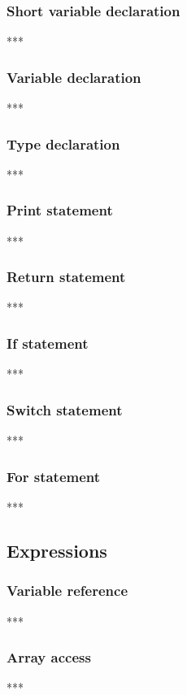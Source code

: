 \documentclass[oneside]{article}
\begin{document}
\subsubsection{Short variable declaration}
***

\subsubsection{Variable declaration}
***

\subsubsection{Type declaration}
***

\subsubsection{Print statement}
***

\subsubsection{Return statement}
***

\subsubsection{If statement}
***

\subsubsection{Switch statement}
***

\subsubsection{For statement}
***


\subsection{Expressions}

\subsubsection{Variable reference}
***

\subsubsection{Array access}
***
\end{document}
